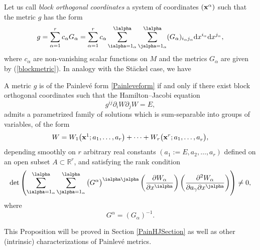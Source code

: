 Let us call \emph{block orthogonal coordinates} a system of coordinates $({\bf x}^{\alpha})$ such that the metric $g$ has the form
\begin{gather*} %
 g=\sum_{\alpha =1}^{r} c_\alpha G_\alpha = \sum_{\alpha =1}^{r} c_\alpha \sum_{\ialpha = 1_{\alpha}}^{\lalpha}\sum_{\jalpha = 1_{\alpha}}^{\lalpha}(G_{\alpha})_{i_{\alpha}j_{\alpha}}{\rm d}x^{i_{\alpha}}{\rm d}x^{j_{\alpha}},
\end{gather*}
where $c_\alpha$ are non-vanishing scalar functions on $M$ and the metrics $G_\alpha$ are given by (\ref{blockmetric}).
In analogy with the St\"ackel case, we have

\begin{Proposition} \label{HJSeparability-Painleve}A metric $g$ is of the Painlev\'e form \eqref{Painleveform} if and only if there exist block orthogonal coordinates such that the Hamilton--Jacobi equation
\[
g^{ij}\partial_{i}W\partial_{j}W=E,
\]
admits a parametrized family of solutions which is sum-separable into groups of variables, of the form
\begin{gather}\label{Painsepform}
W=W_{1}\big({\bf {x}}^{1};{{a}}_{1},\dots ,{{a}}_{r}\big)+\cdots+W_{r}\big({\bf {x}}^{r};{{{a}}_{1},\dots, {a}}_{r}\big),
\end{gather}
depending smoothly on $r$ arbitrary real constants $({{a}}_{1}:=E,a_{2},\dots ,{{a}}_{r})$ defined on an open subset $A\subset \mathbb{R}^{r}$, and satisfying the rank condition
\begin{gather}\label{rankPainHJ}
\det \left(\sum_{\ialpha =1_{\alpha}}^{\lalpha}\sum_{\jalpha =1_{\alpha}}^{\lalpha}\big(G^{\alpha}\big)^{\ialpha \jalpha}\left(\frac{\partial W_{\alpha}}{\partial x^{\ialpha}}\right)\left( \frac{\partial^{2}W_{\alpha}}{\partial a_{\gamma}\partial x^{\jalpha}}\right)\right)\neq 0,
\end{gather}
where
\[
G^{\alpha} = (G_{\alpha})^{-1 }.
\]
\end{Proposition}
This Proposition will be proved in Section \ref{PainHJSection} as well as other (intrinsic) characterizations of Painlev\'e metrics.

